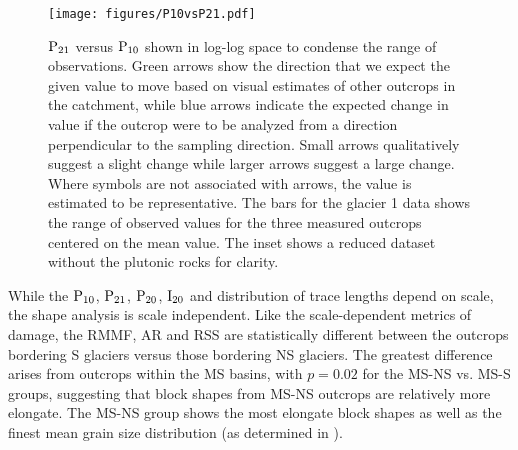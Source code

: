 \documentclass[draft,linenumbers]{agujournal}
\begin{document}
\begin{figure}[H]
  \centering
  \texttt{[image: figures/P10vsP21.pdf]}
  \caption[]{$\rm P_{21}$ versus $\rm P_{10}$ shown in log-log space to condense the range of observations. Green arrows show the direction that we expect the given value to move based on visual estimates of other outcrops in the catchment, while blue arrows indicate the expected change in value if the outcrop were to be analyzed from a direction perpendicular to the sampling direction. Small arrows qualitatively suggest a slight change while larger arrows suggest a large change. Where symbols are not associated with arrows, the value is estimated to be representative. The bars for the glacier 1 data shows the range of observed values for the three measured outcrops centered on the mean value. The inset shows a reduced dataset without the plutonic rocks for clarity.}
\label{fig1}
\end{figure}

While the $\rm P_{10}$, $\rm P_{21}$, $\rm P_{20}$, $\rm I_{20}$ and distribution of trace lengths depend on scale, the shape analysis is scale independent. Like the scale-dependent metrics of damage, the RMMF, AR and RSS are statistically different between the outcrops bordering S glaciers versus those bordering NS glaciers. The greatest difference arises from outcrops within the MS basins, with $p=0.02$ for the MS-NS vs. MS-S groups, suggesting that block shapes from MS-NS outcrops are relatively more elongate. The MS-NS group shows the most elongate block shapes as well as the finest mean grain size distribution (as determined in \cite{Crompton2016}).
\end{document}
